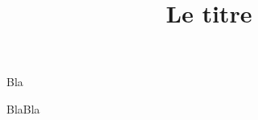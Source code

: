 \documentclass{beamer}
\title{Le titre}
\begin{document}
\begin{frame}[t,fragile]

  \begin{center}
   \Large Bla
  \end{center}

  \vspace{3cm}

  BlaBla


\end{frame}
\end{document}
